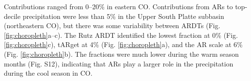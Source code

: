 \documentclass[draft]{agujournal2019}
\begin{document}
Contributions ranged from 0--20\% in eastern CO. Contributions from ARs to top-decile precipitation were less than 5\% in the Upper South Platte subbasin (northeastern CO), but there was some variability between ARDTs (Fig. \ref{fig:choropleth}a--c). The Rutz ARDT identified the lowest fraction at 0\% (Fig. \ref{fig:choropleth}c), tARget at 4\% (Fig. \ref{fig:choropleth}a), and the AR scale at 6\% (Fig. \ref{fig:choropleth}b). The fractions were much lower during the warm season months (Fig. S12), indicating that ARs play a larger role in the precipitation during the cool season in CO.




\end{document}

